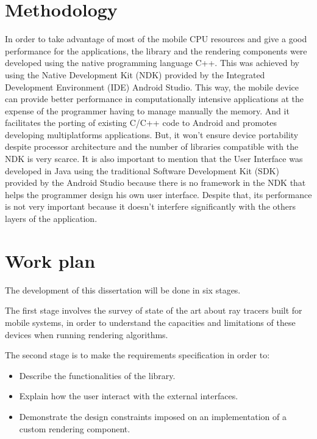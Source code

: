 \section{Methodology}

\par
In order to take advantage of most of the mobile CPU resources and give a good performance for the applications, the library and the rendering components were developed using the native programming language C++.
This was achieved by using the Native Development Kit (NDK) provided by the Integrated Development Environment (IDE) Android Studio.
This way, the mobile device can provide better performance in computationally intensive applications at the expense of the programmer having to manage manually the memory.
And it facilitates the porting of existing C/C++ code to Android and promotes developing multiplatforms applications.
But, it won't ensure device portability despite processor architecture and the number of libraries compatible with the NDK is very scarce.
It is also important to mention that the User Interface was developed in Java using the traditional Software Development Kit (SDK) provided by the Android Studio because there is no framework in the NDK that helps the programmer design his own user interface.
Despite that, its performance is not very important because it doesn't interfere significantly with the others layers of the application.



\iffalse

\section{Work plan}

\par
The development of this dissertation will be done in six stages.

\par
The first stage involves the survey of state of the art about ray tracers built for mobile systems, in order to understand the capacities and limitations of these devices when running rendering algorithms.

\par
The second stage is to make the requirements specification in order to:

\begin{itemize}
\item Describe the functionalities of the library.
\item Explain how the user interact with the external interfaces.
\item Demonstrate the design constraints imposed on an implementation of a custom rendering component.
\end{itemize}

